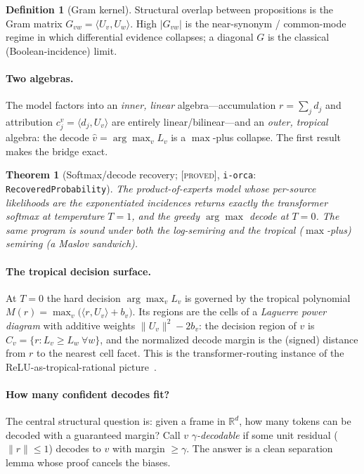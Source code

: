 \documentclass[sigconf,nonacm]{acmart}
\newtheorem{theorem}{Theorem}
\theoremstyle{definition}
\newtheorem{definition}{Definition}
\newcommand{\R}{\mathbb{R}}
\newcommand{\inner}[2]{\langle #1, #2\rangle}
\newcommand{\Uv}{U_v}
\renewcommand{\dj}{d_j}  %
\newcommand{\proved}{\textsc{[proved]}}
\begin{document}
\begin{definition}[Gram kernel]
Structural overlap between propositions is the Gram matrix
$G_{vw}=\inner{\Uv}{U_w}$. High $|G_{vw}|$ is the near-synonym / common-mode regime
in which differential evidence collapses; a diagonal $G$ is the classical
(Boolean-incidence) limit.
\end{definition}

\paragraph{Two algebras.}
The model factors into an \emph{inner, linear} algebra---accumulation
$r=\sum_j \dj$ and attribution $c_j^v=\inner{\dj}{\Uv}$ are entirely
linear/bilinear---and an \emph{outer, tropical} algebra: the decode
$\hat v=\arg\max_v L_v$ is a $\max$-plus collapse. The first result makes the bridge
exact.

\begin{theorem}[Softmax/decode recovery; \proved, \texttt{i-orca}: \texttt{RecoveredProbability}]
\label{thm:softmax}
The product-of-experts model whose per-source likelihoods are the exponentiated
incidences returns exactly the transformer softmax at temperature $T{=}1$, and the
greedy $\arg\max$ decode at $T{=}0$. The same program is sound under both the
log-semiring and the tropical ($\max$-plus) semiring (a Maslov sandwich).
\end{theorem}

\paragraph{The tropical decision surface.}
At $T{=}0$ the hard decision $\arg\max_v L_v$ is governed by the tropical polynomial
$M(r)=\max_v\bigl(\inner{r}{\Uv}+b_v\bigr)$. Its regions are the cells of a
\emph{Laguerre power diagram} with additive weights $\|\Uv\|^2-2b_v$: the decision
region of $v$ is $C_v=\{r:L_v\ge L_w~\forall w\}$, and the normalized decode margin
is the (signed) distance from $r$ to the nearest cell facet. This is the
transformer-routing instance of the ReLU-as-tropical-rational
picture~\cite{zhang2018tropical,maclagan2015tropical}.

\paragraph{How many confident decodes fit?}
The central structural question is: given a frame in $\R^d$, how many tokens can be
decoded with a guaranteed margin? Call $v$ \emph{$\gamma$-decodable} if some unit
residual ($\|r\|\le1$) decodes to $v$ with margin $\ge\gamma$. The answer is a clean
separation lemma whose proof cancels the biases.
\end{document}
